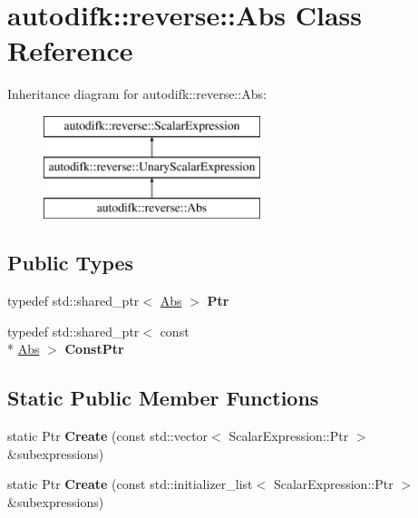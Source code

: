 \hypertarget{classautodifk_1_1reverse_1_1_abs}{\section{autodifk\-:\-:reverse\-:\-:Abs Class Reference}
\label{classautodifk_1_1reverse_1_1_abs}
}
Inheritance diagram for autodifk\-:\-:reverse\-:\-:Abs\-:\begin{figure}[H]
\begin{center}
\leavevmode
\includegraphics[height=3.000000cm]{classautodifk_1_1reverse_1_1_abs}
\end{center}
\end{figure}
\subsection*{Public Types}
\begin{DoxyCompactItemize}
\item 
\hypertarget{classautodifk_1_1reverse_1_1_abs_a1fe7cfa1fda1b9a91f4de60ed384c5db}{typedef std\-::shared\-\_\-ptr$<$ \hyperlink{classautodifk_1_1reverse_1_1_abs}{Abs} $>$ {\bfseries Ptr}}\label{classautodifk_1_1reverse_1_1_abs_a1fe7cfa1fda1b9a91f4de60ed384c5db}

\item 
\hypertarget{classautodifk_1_1reverse_1_1_abs_a670da446cde5341249ef5427b8583a7c}{typedef std\-::shared\-\_\-ptr$<$ const \\*
\hyperlink{classautodifk_1_1reverse_1_1_abs}{Abs} $>$ {\bfseries Const\-Ptr}}\label{classautodifk_1_1reverse_1_1_abs_a670da446cde5341249ef5427b8583a7c}

\end{DoxyCompactItemize}
\subsection*{Static Public Member Functions}
\begin{DoxyCompactItemize}
\item 
\hypertarget{classautodifk_1_1reverse_1_1_abs_a8b17fb02413baf6e0d66ebf07cd53897}{static Ptr {\bfseries Create} (const std\-::vector$<$ Scalar\-Expression\-::\-Ptr $>$ \&subexpressions)}\label{classautodifk_1_1reverse_1_1_abs_a8b17fb02413baf6e0d66ebf07cd53897}

\item 
\hypertarget{classautodifk_1_1reverse_1_1_abs_a9b2cb0ed31387b12623d9a0dd1cefcd1}{static Ptr {\bfseries Create} (const std\-::initializer\-\_\-list$<$ Scalar\-Expression\-::\-Ptr $>$ \&subexpressions)}\label{classautodifk_1_1reverse_1_1_abs_a9b2cb0ed31387b12623d9a0dd1cefcd1}

\end{DoxyCompactItemize}
